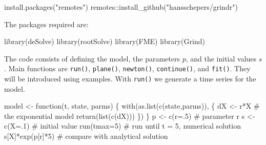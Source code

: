 \documentclass[
  a4paper,
  DIV=11,
  numbers=noendperiod,
  oneside]{scrreprt}
\newenvironment{Shaded}{}{}
\newcommand{\AttributeTok}[1]{\textcolor[rgb]{0.84,0.23,0.29}{#1}}
\newcommand{\CommentTok}[1]{\textcolor[rgb]{0.42,0.45,0.49}{#1}}
\newcommand{\ControlFlowTok}[1]{\textcolor[rgb]{0.84,0.23,0.29}{#1}}
\newcommand{\DecValTok}[1]{\textcolor[rgb]{0.00,0.36,0.77}{#1}}
\newcommand{\FunctionTok}[1]{\textcolor[rgb]{0.44,0.26,0.76}{#1}}
\newcommand{\NormalTok}[1]{\textcolor[rgb]{0.14,0.16,0.18}{#1}}
\newcommand{\OtherTok}[1]{\textcolor[rgb]{0.44,0.26,0.76}{#1}}
\newcommand{\SpecialCharTok}[1]{\textcolor[rgb]{0.00,0.36,0.77}{#1}}
\newcommand{\StringTok}[1]{\textcolor[rgb]{0.01,0.18,0.38}{#1}}
\begin{document}
\begin{Shaded}
\begin{Highlighting}[]
\FunctionTok{install.packages}\NormalTok{(}\StringTok{"remotes"}\NormalTok{)}
\NormalTok{remotes}\SpecialCharTok{::}\FunctionTok{install\_github}\NormalTok{(}\StringTok{"hansschepers/grindr"}\NormalTok{)}
\end{Highlighting}
\end{Shaded}

The packages required are:

\begin{Shaded}
\begin{Highlighting}[]
\FunctionTok{library}\NormalTok{(deSolve)}
\FunctionTok{library}\NormalTok{(rootSolve)}
\FunctionTok{library}\NormalTok{(FME)}
\FunctionTok{library}\NormalTok{(Grind)}
\end{Highlighting}
\end{Shaded}

The code consists of defining the model, the parameters \(p\), and the
initial values \(s\). Main functions are \texttt{run()},
\texttt{plane()}, \texttt{newton()}, \texttt{continue()}, and
\texttt{fit()}. They will be introduced using examples. With
\texttt{run()} we generate a time series for the model.

\begin{Shaded}
\begin{Highlighting}[]
\NormalTok{model }\OtherTok{\textless{}{-}} \ControlFlowTok{function}\NormalTok{(t, state, parms) \{}
  \FunctionTok{with}\NormalTok{(}\FunctionTok{as.list}\NormalTok{(}\FunctionTok{c}\NormalTok{(state,parms)), \{}
\NormalTok{    dX }\OtherTok{\textless{}{-}}\NormalTok{ r}\SpecialCharTok{*}\NormalTok{X            }\CommentTok{\# the exponential model}
      \FunctionTok{return}\NormalTok{(}\FunctionTok{list}\NormalTok{(}\FunctionTok{c}\NormalTok{(dX)))}
\NormalTok{  \})}
\NormalTok{\}}
\NormalTok{p }\OtherTok{\textless{}{-}} \FunctionTok{c}\NormalTok{(}\AttributeTok{r=}\NormalTok{.}\DecValTok{5}\NormalTok{) }\CommentTok{\# parameter r}
\NormalTok{s }\OtherTok{\textless{}{-}} \FunctionTok{c}\NormalTok{(}\AttributeTok{X=}\NormalTok{.}\DecValTok{1}\NormalTok{) }\CommentTok{\# initial value}
\FunctionTok{run}\NormalTok{(}\AttributeTok{tmax=}\DecValTok{5}\NormalTok{) }\CommentTok{\# run until t = 5, numerical solution}
\NormalTok{s[}\StringTok{\textquotesingle{}X\textquotesingle{}}\NormalTok{]}\SpecialCharTok{*}\FunctionTok{exp}\NormalTok{(p[}\StringTok{\textquotesingle{}r\textquotesingle{}}\NormalTok{]}\SpecialCharTok{*}\DecValTok{5}\NormalTok{) }\CommentTok{\# compare with analytical solution}
\end{Highlighting}
\end{Shaded}
\end{document}
